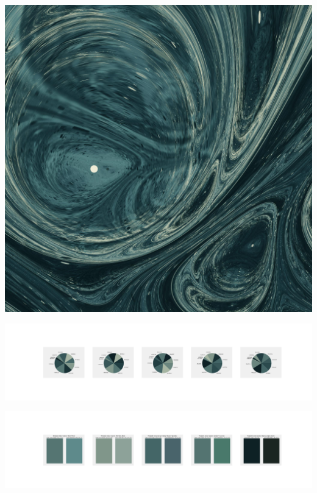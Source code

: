 \documentclass[11pt]{article}
\begin{document}
\begin{landscape}

    \begin{center}
    \includegraphics[width=\textwidth]{./nbimg/file (1).jpg}
    \end{center}

    \begin{center}
    \includegraphics[width=250mm]{./nbimg/pie-0.jpg}
    \end{center}

    \begin{center}
    \includegraphics[width=250mm]{./nbimg/peak-0.jpg}
    \end{center}
    


\end{landscape}
\end{document}
